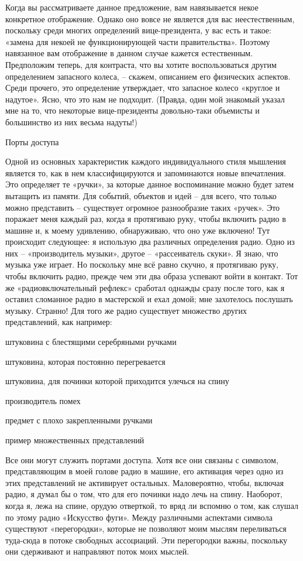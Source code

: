 \documentclass[../main.tex]{subfiles}
\begin{document}
Когда вы рассматриваете данное предложение, вам навязывается некое конкретное отображение. Однако оно вовсе не является для вас неестественным, поскольку среди многих определений вице-президента, у вас есть и такое: «замена для некоей не функционирующей части правительства». Поэтому навязанное вам отображение в данном случае кажется естественным. Предположим теперь, для контраста, что вы хотите воспользоваться другим определением запасного колеса, \--- скажем, описанием его физических аспектов. Среди прочего, это определение утверждает, что запасное колесо «круглое и надутое». Ясно, что это нам не подходит. (Правда, один мой знакомый указал мне на то, что некоторые вице-президенты довольно-таки объемисты и большинство из них весьма надуты!)

Порты доступа

Одной из основных характеристик каждого индивидуального стиля мышления является то, как в нем классифицируются и запоминаются новые впечатления. Это определяет те «ручки», за которые данное воспоминание можно будет затем вытащить из памяти. Для событий, объектов и идей \--- для всего, что только можно представить \--- существует огромное разнообразие таких «ручек». Это поражает меня каждый раз, когда я протягиваю руку, чтобы включить радио в машине и, к моему удивлению, обнаруживаю, что оно уже включено! Тут происходит следующее: я использую два различных определения радио. Одно из них \--- «производитель музыки», другое \--- «рассеиватель скуки». Я знаю, что музыка уже играет. Но поскольку мне всё равно скучно, я протягиваю руку, чтобы включить радио, прежде чем эти два образа успевают войти в контакт. Тот же «радиовключательный рефлекс» сработал однажды сразу после того, как я оставил сломанное радио в мастерской и ехал домой; мне захотелось послушать музыку. Странно! Для того же радио существует множество других представлений, как например:

штуковина с блестящими серебряными ручками

штуковина, которая постоянно перегревается

штуковина, для починки которой приходится улечься на спину

производитель помех

предмет с плохо закрепленными ручками

пример множественных представлений

Все они могут служить портами доступа. Хотя все они связаны с символом, представляющим в моей голове радио в машине, его активация через одно из этих представлений не активирует остальных. Маловероятно, чтобы, включая радио, я думал бы о том, что для его починки надо лечь на спину. Наоборот, когда я, лежа на спине, орудую отверткой, то вряд ли вспомню о том, как слушал по этому радио «Искусство фуги». Между различными аспектами символа существуют «перегородки», которые не позволяют моим мыслям переливаться туда-сюда в потоке свободных ассоциаций. Эти перегородки важны, поскольку они сдерживают и направляют поток моих мыслей.
\end{document}
